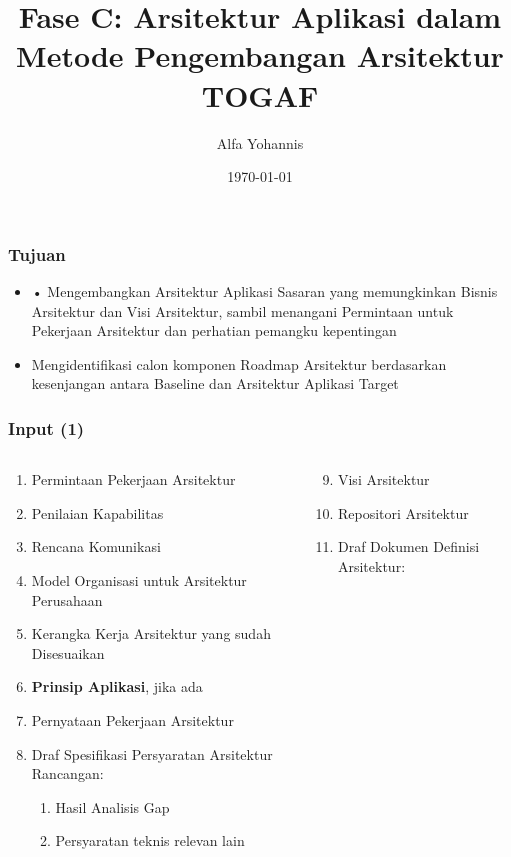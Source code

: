 \documentclass[aspectratio=169]{beamer}
\title{Fase C: Arsitektur Aplikasi dalam Metode Pengembangan Arsitektur TOGAF}
\author{Alfa Yohannis}
\date{\today}
\begin{document}
\frame{\titlepage}

\begin{frame}
\frametitle{Tujuan}
\begin{itemize}
\item • Mengembangkan Arsitektur Aplikasi Sasaran yang memungkinkan Bisnis
Arsitektur dan Visi Arsitektur, sambil menangani Permintaan
untuk Pekerjaan Arsitektur dan perhatian pemangku kepentingan
\item Mengidentifikasi calon komponen Roadmap Arsitektur berdasarkan kesenjangan
antara Baseline dan Arsitektur Aplikasi Target
\end{itemize}
\end{frame}

	\begin{frame}
	\frametitle{Input (1)}
	\begin{columns}
		\begin{column}{0.5\textwidth}
			\begin{center}
				\begin{enumerate}
					\item Permintaan Pekerjaan Arsitektur
					\item Penilaian Kapabilitas
					\item Rencana Komunikasi
					\item Model Organisasi untuk Arsitektur Perusahaan
					\item Kerangka Kerja Arsitektur yang sudah Disesuaikan
					\item \textbf{Prinsip Aplikasi}, jika ada
					\item Pernyataan Pekerjaan Arsitektur
					\item Draf Spesifikasi Persyaratan Arsitektur Rancangan:
					\begin{enumerate}
						\item Hasil Analisis Gap
						\item Persyaratan teknis relevan lain
					\end{enumerate}
				\end{enumerate}
			\end{center}
		\end{column}
		\begin{column}{0.5\textwidth}
			\begin{center}
				\begin{enumerate}
					\setcounter{enumi}{8}
					\item Visi Arsitektur
					\item Repositori Arsitektur
					\item Draf Dokumen Definisi Arsitektur:

\end{enumerate}
\end{center}
\end{column}
\end{columns}
\end{frame}
\end{document}
